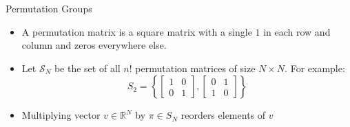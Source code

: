 \documentclass[aspectratio=169,10pt]{beamer}
\newcommand{\R}{\ensuremath{\mathbb{R}}}
\begin{document}
		
\begin{frame}[label = permutationgroup]{Permutation Groups}
	
	\begin{itemize}
		
		\item A permutation matrix is a square matrix with a single $1$ in each row and column and zeros everywhere else.\vspace{0.1in}
		
			
			
		\item Let $\mathcal{S}_N$ be the set of all $n!$ permutation matrices of size $N \times N$. For example:
		\begin{equation*}
			S_2 = \left\{ \begin{bmatrix}1 & 0 \\ 0 & 1\end{bmatrix},  \begin{bmatrix}0 & 1 \\ 1 & 0\end{bmatrix}\right\}
		\end{equation*}
		\item Multiplying vector $v \in \R^N$ by $\pi \in S_N$ reorders elements of $v$\vspace{0.1in}
		
		
	\end{itemize}
\end{frame}
\end{document}
